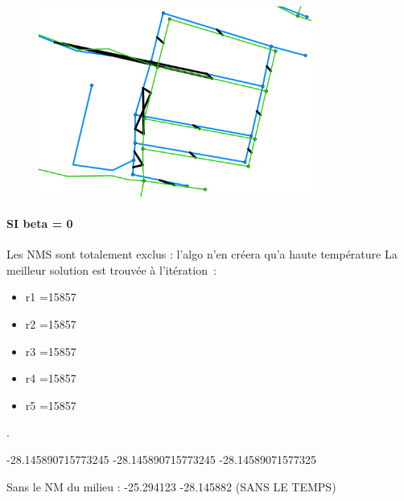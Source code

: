 \documentclass[a4paper,12pt]{article}
\begin{document}
\begin{figure}
\includegraphics[width=0.8\textwidth]{./images/illus_graphs/greneta_nm_beta1.png}
\end{figure}

\paragraph{SI beta = 0}
Les NMS sont totalement exclus : l'algo n'en créera qu'a haute température
La meilleur solution est trouvée à l'itération~:
\begin{itemize}
\item  r1 =15857
\item  r2 =15857
\item  r3 =15857\\
\item  r4 =15857\\
\item  r5 =15857
\end{itemize}.


-28.145890715773245
-28.145890715773245
-28.14589071577325

Sans le NM du milieu : 
-25.294123
-28.145882 (SANS LE TEMPS)
\end{document}
